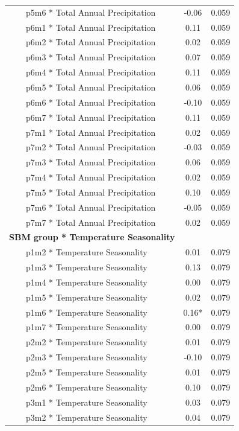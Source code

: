\documentclass[
]{agujournal2019}
\begin{document}
\begin{longtable*}{lcc}
    p5m6 * Total Annual Precipitation & -0.06 & 0.059 \\ 
    p6m1 * Total Annual Precipitation & 0.11 & 0.059 \\ 
    p6m2 * Total Annual Precipitation & 0.02 & 0.059 \\ 
    p6m3 * Total Annual Precipitation & 0.07 & 0.059 \\ 
    p6m4 * Total Annual Precipitation & 0.11 & 0.059 \\ 
    p6m5 * Total Annual Precipitation & 0.06 & 0.059 \\ 
    p6m6 * Total Annual Precipitation & -0.10 & 0.059 \\ 
    p6m7 * Total Annual Precipitation & 0.11 & 0.059 \\ 
    p7m1 * Total Annual Precipitation & 0.02 & 0.059 \\ 
    p7m2 * Total Annual Precipitation & -0.03 & 0.059 \\ 
    p7m3 * Total Annual Precipitation & 0.06 & 0.059 \\ 
    p7m4 * Total Annual Precipitation & 0.02 & 0.059 \\ 
    p7m5 * Total Annual Precipitation & 0.10 & 0.059 \\ 
    p7m6 * Total Annual Precipitation & -0.05 & 0.059 \\ 
    p7m7 * Total Annual Precipitation & 0.02 & 0.059 \\ 
\textbf{SBM group * Temperature Seasonality} &  &  \\ 
    p1m2 * Temperature Seasonality & 0.01 & 0.079 \\ 
    p1m3 * Temperature Seasonality & 0.13 & 0.079 \\ 
    p1m4 * Temperature Seasonality & 0.00 & 0.079 \\ 
    p1m5 * Temperature Seasonality & 0.02 & 0.079 \\ 
    p1m6 * Temperature Seasonality & 0.16* & 0.079 \\ 
    p1m7 * Temperature Seasonality & 0.00 & 0.079 \\ 
    p2m2 * Temperature Seasonality & 0.01 & 0.079 \\ 
    p2m3 * Temperature Seasonality & -0.10 & 0.079 \\ 
    p2m5 * Temperature Seasonality & 0.01 & 0.079 \\ 
    p2m6 * Temperature Seasonality & 0.10 & 0.079 \\ 
    p3m1 * Temperature Seasonality & 0.03 & 0.079 \\ 
    p3m2 * Temperature Seasonality & 0.04 & 0.079 \\ 

\end{longtable*}
\end{document}
